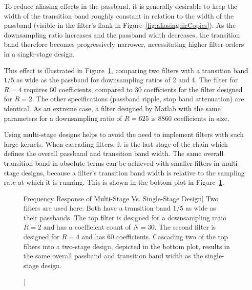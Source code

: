 To  reduce  aliasing  effects  in  the passband,  it  is  generally  desirable
to  keep  the width  of  the  transition  band  roughly constant  in  relation
to  the   width  of   the  passband   (visible  in   the  filter's   flank  in
Figure~\ref{fig:aliasing:iirCopies}).   As  the downsampling  ratio  increases
and  the  passband width  decreases,  the  transition band  therefore  becomes
progressively narrower,  necessitating higher filter orders  in a single-stage
design.

This   effect  is   illustrated  in   Figure~\ref{fig:fdesign:tbw_width_Rvar},
comparing two filters with a transition band $1/5$ as wide as the passband for
downsampling  ratios of  \num{2} and  \num{4}. The filter  for $R=4$  requires
\num{60}  coefficients,  compared  to  \num{30} coefficients  for  the  filter
designed  for $R=2$.   The other  specifications (passband  ripple, stop  band
attenuation) are identical.   As an extreme case, a filter  designed by Matlab
with the  same parameters for  a downsampling  ratio of $R=625$  is \num{8860}
coefficients in size.

Using multi-stage  designs helps to avoid  the need to implement  filters with
such large kernels.  When cascading filters, it is the last stage of the chain
which defines the overall passband and transition band width. The same overall
transition band  in absolute  terms can  be achieved  with smaller  filters in
multi-stage designs, because  a filter's transition band width  is relative to
the sampling rate at which it is running.  This is shown in the bottom plot in
Figure~\ref{fig:fdesign:tbw_width_Rvar}.

\begin{figure}
    \centering
    
    \caption
        [Frequency Response of Multi-Stage Vs. Single-Stage Design]{%
        Two filters are  used here: Both have a transition band  $1/5$ as wide
        as  their passbands. The  top filter  is designed  for a  downsampling
        ratio $R=2$ and  has a coefficient count of  $N=30$. The second filter
        is designed for $R=4$ and  has \num{60} coefficients. Cascading two of
        the top filters into a two-stage  design, depicted in the bottom plot,
        results in the same overall passband  and transition band width as the
        single-stage design.%
    }
    \label{fig:fdesign:tbw_width_Rvar}
\end{figure}

